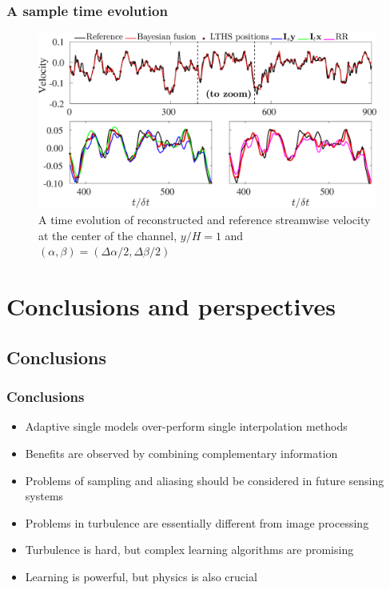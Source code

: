 \documentclass{beamer}
\let\olditem\item
\renewcommand{\item}{\setlength{\itemsep}{\fill}\olditem}
\begin{document}
\begin{frame}
\frametitle{A sample time evolution}
	\begin{figure}
		\includegraphics[width=\textwidth]{./figures/comparisons/channel/improper_point_spacespacing_10_timespacing_10_yid129_zid149.eps}
		\caption*{A time evolution of reconstructed and reference streamwise velocity at the center of the channel, $ y/H=1 $ and $ (\alpha,\beta) = (\Delta \alpha/2,\Delta \beta/2)$}
	\end{figure}
\end{frame}



\section{Conclusions and perspectives}
\subsection[Conclusions]{Conclusions}
\begin{frame}
\frametitle{Conclusions}
\begin{itemize}
	\item Adaptive single models over-perform single interpolation methods
	\item Benefits are observed by combining complementary information
	\item Problems of sampling and aliasing should be considered in future sensing systems
	\item Problems in turbulence are essentially different from image processing
	\item Turbulence is hard, but complex learning algorithms are promising
	\item Learning is powerful, but physics is also crucial
\end{itemize}	
\end{frame}
\end{document}
